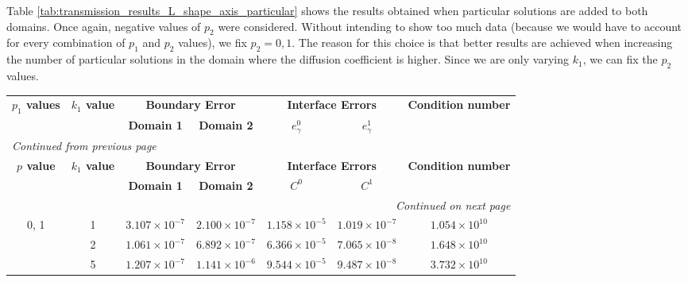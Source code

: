 Table \ref{tab:transmission_results_L_shape_axis_particular} shows the results obtained when particular solutions are added to both domains. Once again, negative values of \(p_2\) were considered. Without intending to show too much data (because we would have to account for every combination of \(p_1\) and \(p_2\) values), we fix \(p_2=0, 1\). The reason for this choice is that better results are achieved when increasing the number of particular solutions in the domain where the diffusion coefficient is higher. Since we are only varying \(k_1\), we can fix the \(p_2\) values.
\pagebreak
\begin{table}[!htbp]
    \centering
    \begin{longtable}{ccccccc}
        \toprule
        \multicolumn{1}{c}{\textbf{\(p_1\) values}} & \multicolumn{1}{c}{\textbf{\(k_1\) value}} & \multicolumn{2}{c}{\textbf{Boundary Error}} & \multicolumn{2}{c}{\textbf{Interface Errors}} & \multicolumn{1}{c}{\textbf{Condition number}} \\
        \cmidrule(lr){2-2} \cmidrule(lr){3-4} \cmidrule(lr){5-6} \cmidrule(lr){7-7}
        & & \textbf{Domain 1} & \textbf{Domain 2} & \textbf{\(e_\gamma^0\)} & \textbf{\(e_\gamma^1\)} & \\
        \midrule
        \endfirsthead %
        \multicolumn{7}{l}{{\footnotesize\emph{Continued from previous page}}} \\
        \toprule
        \multicolumn{1}{c}{\textbf{\(p\) value}} & \multicolumn{1}{c}{\textbf{\(k_1\) value}} & \multicolumn{2}{c}{\textbf{Boundary Error}} & \multicolumn{2}{c}{\textbf{Interface Errors}} & \multicolumn{1}{c}{\textbf{Condition number}} \\
        \cmidrule(lr){2-2} \cmidrule(lr){3-4} \cmidrule(lr){5-6} \cmidrule(lr){7-7}
        & & \textbf{Domain 1} & \textbf{Domain 2} & \textbf{\(C^0\)} & \textbf{\(C^1\)} & \\
        \midrule
        \endhead %
        \midrule[\heavyrulewidth] %
        \multicolumn{7}{r}{{\footnotesize\emph{Continued on next page}}} \\
        \endfoot %
        \bottomrule
        \endlastfoot %

        0, 1 & 1 & $3.107\times10^{-7}$ & $2.100\times10^{-7}$ & $1.158\times10^{-5}$ & $1.019\times10^{-7}$ & $1.054\times10^{10}$ \\
        & 2 & $1.061\times10^{-7}$ & $6.892\times10^{-7}$ & $6.366\times10^{-5}$ & $7.065\times10^{-8}$ & $1.648\times10^{10}$ \\
        & 5 & $1.207\times10^{-7}$ & $1.141\times10^{-6}$ & $9.544\times10^{-5}$ & $9.487\times10^{-8}$ & $3.732\times10^{10}$ \\
        \midrule[\heavyrulewidth] %


\end{longtable}
\end{table}
